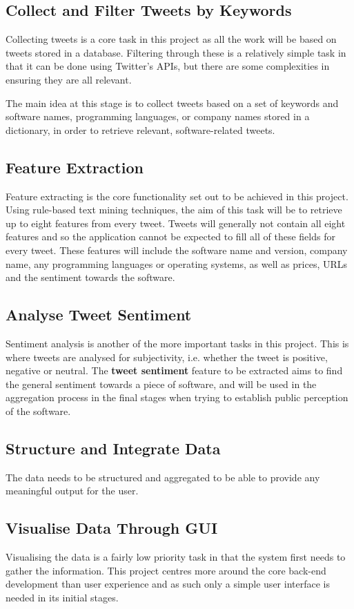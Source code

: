 \subsection{Collect and Filter Tweets by Keywords}
Collecting tweets is a core task in this project as all the work will be based on tweets stored in a database. Filtering through these is a relatively simple task in that it can be done using Twitter's APIs, but there are some complexities in ensuring they are all relevant.

The main idea at this stage is to collect tweets based on a set of keywords and software names, programming languages, or company names stored in a dictionary, in order to retrieve relevant, software-related tweets.

\subsection{Feature Extraction}
Feature extracting is the core functionality set out to be achieved in this project. Using rule-based text mining techniques, the aim of this task will be to retrieve up to eight features from every tweet. Tweets will generally not contain all eight features and so the application cannot be expected to fill all of these fields for every tweet. These features will include the software name and version, company name, any programming languages or operating systems, as well as prices, URLs and the sentiment towards the software.

\subsection{Analyse Tweet Sentiment}
Sentiment analysis is another of the more important tasks in this project. This is where tweets are analysed for subjectivity, i.e. whether the tweet is positive, negative or neutral. The \textbf{tweet sentiment} feature to be extracted aims to find the general sentiment towards a piece of software, and will be used in the aggregation process in the final stages when trying to establish public perception of the software.

\subsection{Structure and Integrate Data}
The data needs to be structured and aggregated to be able to provide any meaningful output for the user.

\subsection{Visualise Data Through GUI}
Visualising the data is a fairly low priority task in that the system first needs to gather the information. This project centres more around the core back-end development than user experience and as such only a simple user interface is needed in its initial stages.

